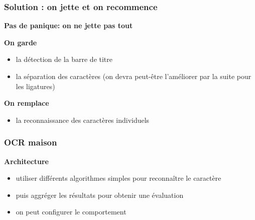 \documentclass[xcolor=dvipsnames]{beamer}
\begin{document}
\begin{frame}
\frametitle{Solution : on jette et on recommence}
    \begin{center}\begin{alertblock}{}
            \begin{center}\textbf{\Large Pas de panique: on ne jette pas tout}\end{center}
    \end{alertblock}\end{center}
    \begin{center}\begin{alertblock}{}
            \begin{center}\textbf{\Large On garde}\end{center}
    \end{alertblock}\end{center}
    \begin{itemize}
    \item la détection de la barre de titre
    \item la séparation des caractères (on devra peut-être l'améliorer par la suite pour les ligatures)
    \end{itemize}
    \begin{center}\begin{alertblock}{}
            \begin{center}\textbf{\Large On remplace}\end{center}
    \end{alertblock}\end{center}
    \begin{itemize}
    \item la reconnaissance des caractères individuels
    \end{itemize}
\end{frame}


\begin{frame}
\frametitle{OCR maison}
    \begin{center}\begin{alertblock}{}
            \begin{center}
            \textbf{\Large Architecture}
            \begin{itemize}
            \item utiliser différents algorithmes simples pour reconnaître le caractère
            \item puis aggréger les résultats pour obtenir une évaluation
            \item on peut configurer le comportement
            \end{itemize}
            \end{center}
    \end{alertblock}\end{center}
\end{frame}
\end{document}

